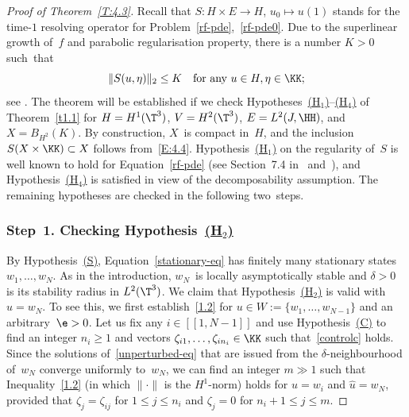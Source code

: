 \begin{proof}[Proof of Theorem~\ref{T:4.3}]
Recall that $S:H\times E\to H$, $u_0\mapsto u(1)$ stands for the time-$1$ resolving operator for Problem~\eqref{rf-pde},~\eqref{rf-pde0}. Due to the superlinear growth of~$f$ and parabolic regularisation property, there is a number $K>0$ such~that
\begin{equation}\label{E:4.4}
\|S(u,\eta)\|_2\le K \quad \text{for any } u\in H, \eta\in \KK;
\end{equation}
see \cite[Lem.\,2.10]{JNPS-cmp2014}. The theorem will be established if we check Hypotheses~\hyperlink{H1}{(H$_1$)}--\hyperlink{H4}{(H$_4$)} of Theorem~\ref{t1.1} for $H=H^1(\T^3)$, $V=H^2(\T^3)$, $E=L^2(J,\HH)$, and $X=B_{H^2}(K)$. By construction, $X$~is compact in~$H$, and the inclusion $S(X\times\KK)\subset X$ follows from~\eqref{E:4.4}. Hypothesis~\hyperlink{H1}{(H$_1$)} on the regularity of~$S$ is well known to hold for Equation~\eqref{rf-pde} (\eg see Section~7.4 in~\cite{KNS-2020} and~\cite{kuksin-1982}), and Hypothesis~\hyperlink{H4}{(H$_4$)} is satisfied in view of the decomposability assumption. The remaining hypotheses are checked in the following two~steps.

\subsubsection*{Step~1. Checking Hypothesis~\protect\hyperlink{H2}{\rm(H$_2$)}} By Hypothesis~\hyperlink{S}{\rm(S)}, Equation~\eqref{stationary-eq} has finitely many stationary states $w_1, \ldots, w_N$. As in the introduction, $w_N$~is locally asymptotically stable and $\delta>0$ is its stability radius in $L^2(\T^3)$. We claim that Hypothesis~\hyperlink{H2}{(H$_2$)} is valid with $\hat u=w_N$. To see this, we first establish~\eqref{1.2} for $u\in W:=\{w_1,\ldots,w_{N-1}\}$ and an arbitrary~$\e>0$. Let us fix any $i\in[\![1,N-1]\!]$ and use Hypothesis~\hyperlink{C}{(C)} to find an integer $n_i\ge1$ and vectors $\zeta_{i1},\dots,\zeta_{in_i}\in\KK$ such that~\eqref{controlc} holds. Since the solutions of~\eqref{unperturbed-eq} that are issued from the $\delta$-neighbourhood of~$w_N$ converge uniformly to~$w_N$, we can find an integer $m\gg1$ such that Inequality~\eqref{1.2} (in which $\|\cdot\|$ is the $H^1$-norm) holds for $u=w_i$ and $\hat u=w_N$, provided that $\zeta_j=\zeta_{ij}$ for $1\le j\le n_i$ and $\zeta_j=0$ for $n_i+1\le j\le m$.


\end{proof}

